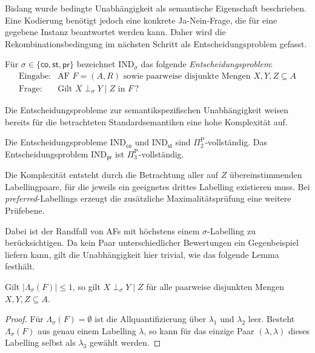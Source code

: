 Bislang wurde bedingte Unabhängigkeit als semantische Eigenschaft beschrieben. 
Eine Kodierung benötigt jedoch eine konkrete Ja-Nein-Frage, 
die für eine gegebene Instanz beantwortet werden kann. 
Daher wird die Rekombinationsbedingung im nächsten Schritt als Entscheidungsproblem gefasst.
\begin{Definition}
    \label{def:sigma-independence-af-dec-problem}
    Für \(\sigma\in\{\mathsf{co},\mathsf{st},\mathsf{pr}\}\) bezeichnet
    \(\mathrm{IND}_\sigma\) das folgende \emph{Entscheidungsproblem}:
    \[
        \begin{array}{ll}
        \text{Eingabe:}
            &\text{AF } F=(A,R)\text{ sowie paarweise disjunkte Mengen }
             X,Y,Z\subseteq A\\
        \text{Frage:}
            &\text{Gilt }X\perp_\sigma Y\mid Z\text{ in }F\,?
        \end{array}
    \]
\end{Definition}
Die Entscheidungsprobleme zur semantikspezifischen Unabhängigkeit weisen
bereits für die betrachteten Standardsemantiken eine hohe Komplexität auf.
\begin{Theorem}
\label{thm:independence-complexity}
Die Entscheidungsprobleme
\(\mathrm{IND}_{\mathsf{co}}\) und
\(\mathrm{IND}_{\mathsf{st}}\) sind
\(\Pi_2^{\mathrm{P}}\)-vollständig.
Das Entscheidungsproblem
\(\mathrm{IND}_{\mathsf{pr}}\) ist
\(\Pi_3^{\mathrm{P}}\)-vollständig.
\end{Theorem}
Die Komplexität entsteht durch die Betrachtung aller auf \(Z\) übereinstimmenden Labellingpaare, 
für die jeweils ein geeignetes drittes Labelling existieren muss. 
Bei \emph{preferred}-Labellings erzeugt die zusätzliche Maximalitätsprüfung eine weitere Prüfebene.

Dabei ist der Randfall von AFs mit höchstens einem \(\sigma\)-Labelling zu berücksichtigen. 
Da kein Paar unterschiedlicher Bewertungen ein Gegenbeispiel liefern kann, 
gilt die Unabhängigkeit hier trivial, wie das folgende Lemma festhält.
\begin{Lemma}
    \label{lem:independence-trivial-labelling-set}
    Gilt \(|\Lambda_\sigma(F)|\leq 1\), so gilt
    \(X\perp_\sigma Y\mid Z\) für alle paarweise disjunkten Mengen
    \(X,Y,Z\subseteq A\).
\end{Lemma}

\begin{proof}
    Für \(\Lambda_\sigma(F)=\emptyset\) ist die Allquantifizierung über
    \(\lambda_1\) und \(\lambda_2\) leer. Besteht
    \(\Lambda_\sigma(F)\) aus genau einem Labelling \(\lambda\), so kann
    für das einzige Paar \((\lambda,\lambda)\) dieses Labelling selbst als
    \(\lambda_3\) gewählt werden.
\end{proof}

